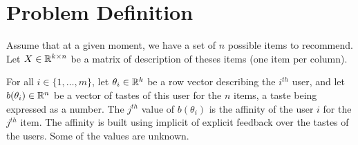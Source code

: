 \documentclass[twoside,leqno,twocolumn]{article}
\newcommand{\pp}[1]{\color{red}(pp) #1\color{black}}
\begin{document}





\section{Problem Definition}
\label{def}
Assume that at a given moment, we have a set of $n$ possible items to recommend. Let $X \in \mathbb{R}^{k\times n}$ be a matrix of description of theses items (one item per column). 

For all $i \in \{1,\ldots,m\}$, let $\theta_i \in \mathbb{R}^{k}$ be a row vector describing the $i^{th}$ user, and let $b(\theta_i) \in \mathbb{R}^n$ be a vector of tastes of this user for the $n$ items, a taste being expressed as a number. The $j^{th}$ value of $b(\theta_i)$ is the affinity of the user $i$ for the $j^{th}$ item. The affinity is built using implicit of explicit feedback over the tastes of the users. Some of the values are unknown. 
\end{document}

